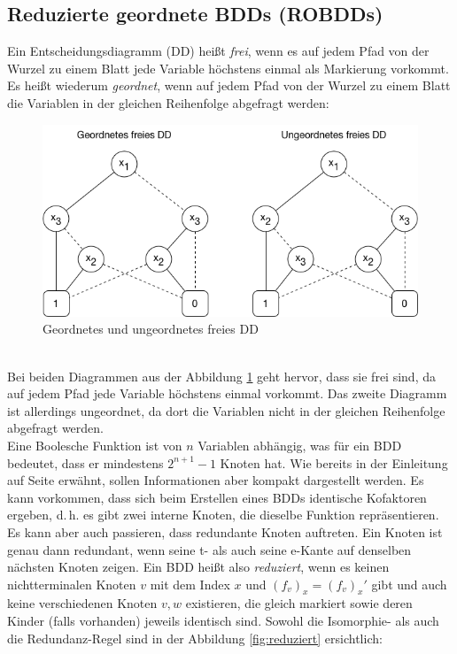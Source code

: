 \subsection{Reduzierte geordnete BDDs (ROBDDs)}
\label{sec:ordnung}
Ein Entscheidungsdiagramm (DD) heißt \emph{frei}, wenn es auf jedem Pfad von der Wurzel zu einem Blatt jede Variable höchstens einmal als Markierung vorkommt. Es heißt wiederum \emph{geordnet}, wenn auf jedem Pfad von der Wurzel zu einem Blatt die Variablen in der gleichen Reihenfolge abgefragt werden:
\begin{figure}[bth]
	\centering
	\includegraphics[scale=0.5]{./img/ordnung}
	\caption[Geordnetes und ungeordnetes freies DD]{Geordnetes und ungeordnetes freies DD}
	\label{fig:ordnung}
\end{figure}\\
\noindent
Bei beiden Diagrammen aus der Abbildung \ref{fig:ordnung} geht hervor, dass sie frei sind, da auf jedem Pfad jede Variable höchstens einmal vorkommt. Das zweite Diagramm ist allerdings ungeordnet, da dort die Variablen nicht in der gleichen Reihenfolge abgefragt werden.\\
Eine Boolesche Funktion ist von $n$ Variablen abhängig, was für ein BDD bedeutet, dass er mindestens $2^{n+1}-1$ Knoten hat. Wie bereits in der Einleitung auf Seite \pageref{sec:einleitung} erwähnt, sollen Informationen aber kompakt dargestellt werden. Es kann vorkommen, dass sich beim Erstellen eines BDDs identische Kofaktoren ergeben, d.\,h. es gibt zwei interne Knoten, die dieselbe Funktion repräsentieren. Es kann aber auch passieren, dass redundante Knoten auftreten. Ein Knoten ist genau dann redundant, wenn seine t- als auch seine e-Kante auf denselben nächsten Knoten zeigen. Ein BDD heißt also \emph{reduziert}, wenn es keinen nichtterminalen Knoten $v$ mit dem Index $x$ und $(f_v)_x = (f_v)_x'$ gibt und auch keine verschiedenen Knoten $v, w$ existieren, die gleich markiert  sowie deren Kinder (falls vorhanden) jeweils identisch sind. Sowohl die Isomorphie- als auch die Redundanz-Regel sind in der Abbildung \ref{fig:reduziert} ersichtlich:
